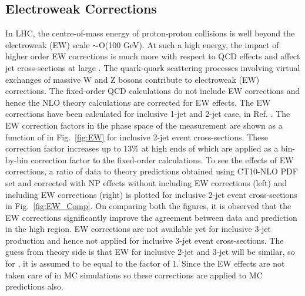 \subsection{Electroweak Corrections}
\label{sec:EW}
In LHC, the centre-of-mass energy of proton-proton collisions is well beyond the electroweak (EW) scale $\sim$O(100 GeV). At such a high energy, the impact of higher order EW corrections is much more with respect to QCD effects \cite{Hollik:2004dz} and affect jet cross-sections at large \httwo. The quark-quark scattering processes involving virtual exchanges of massive W and Z bosons contribute to electroweak (EW) corrections. The fixed-order QCD calculations do not include EW corrections and hence the NLO theory calculations are corrected for EW effects. The EW corrections have been calculated for inclusive 1-jet and 2-jet case, in Ref. \cite{Dittmaier:2012kx}. The EW correction factors in the phase space of the measurement are shown as a function of \httwo in Fig.~\ref{fig:EW} for inclusive 2-jet event cross-sections. These correction factor increases up to 13\% at high ends of \httwo which are applied as a bin-by-bin correction factor to the fixed-order \NLOJETPP calculations. To see the effects of EW corrections, a ratio of data to theory predictions obtained using CT10-NLO PDF set and corrected with NP effects without including EW corrections (left) and including EW corrections (right) is plotted for inclusive 2-jet event cross-sections in Fig.~\ref{fig:EW_Comp}. On comparing both the figures, it is observed that the EW corrections significantly improve the agreement between data and prediction in the high \httwo region. EW corrections are not available yet for inclusive 3-jet production and hence not applied for inclusive 3-jet event cross-sections. The guess from theory side is that EW for inclusive 2-jet and 3-jet will be similar, so for \ratio, it is assumed to be equal to the factor of 1. Since the EW effects are not taken care of in MC simulations so these corrections are applied to MC predictions also. 

